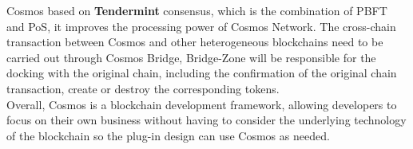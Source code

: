 \noindent Cosmos based on \textbf{Tendermint} consensus, which is the combination of PBFT and PoS, it improves the processing power of Cosmos Network. The cross-chain transaction between Cosmos and other heterogeneous blockchains need to be carried out through Cosmos Bridge, Bridge-Zone will be responsible for the docking with the original chain, including the confirmation of the original chain transaction, create or destroy the corresponding tokens.\\
\noindent Overall, Cosmos is a blockchain development framework, allowing developers to focus on their own business without having to consider the underlying technology of the blockchain so the plug-in design can use Cosmos as needed.

%
%
%
